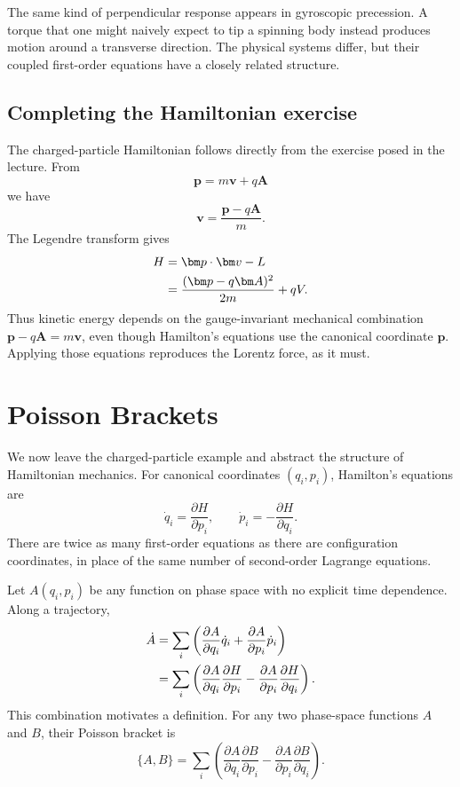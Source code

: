 The same kind of perpendicular response appears in gyroscopic precession. A
torque that one might naively expect to tip a spinning body instead produces
motion around a transverse direction. The physical systems differ, but their
coupled first-order equations have a closely related structure.

\subsection{Completing the Hamiltonian exercise}

The charged-particle Hamiltonian follows directly from the exercise posed in
the lecture. From
\begin{equation}
 \bm p=m\bm v+q\bm A
\end{equation}
we have
\begin{equation}
 \bm v=\frac{\bm p-q\bm A}{m}.
\end{equation}
The Legendre transform gives
\begin{align}
 H&=\bm p\cdot\bm v-L\notag\\
  &=\frac{(\bm p-q\bm A)^2}{2m}+qV.
 \label{eq:l08-charged-hamiltonian}
\end{align}
Thus kinetic energy depends on the gauge-invariant mechanical combination
\(\bm p-q\bm A=m\bm v\), even though Hamilton's equations use the canonical
coordinate \(\bm p\). Applying those equations reproduces the Lorentz force,
as it must.

\section{Poisson Brackets}

We now leave the charged-particle example and abstract the structure of
Hamiltonian mechanics. For canonical coordinates \((q_i,p_i)\), Hamilton's
equations are
\begin{equation}
 \dot q_i=\frac{\partial H}{\partial p_i},
 \qquad
 \dot p_i=-\frac{\partial H}{\partial q_i}.
 \label{eq:l08-hamilton-equations}
\end{equation}
There are twice as many first-order equations as there are configuration
coordinates, in place of the same number of second-order Lagrange equations.

Let \(A(q_i,p_i)\) be any function on phase space with no explicit time
dependence. Along a trajectory,
\begin{align}
 \dot A
 &=\sum_i\left(
 \frac{\partial A}{\partial q_i}\dot q_i
 +\frac{\partial A}{\partial p_i}\dot p_i
 \right)\notag\\
 &=\sum_i\left(
 \frac{\partial A}{\partial q_i}\frac{\partial H}{\partial p_i}
 -\frac{\partial A}{\partial p_i}\frac{\partial H}{\partial q_i}
 \right).
 \label{eq:l08-Adot-chain-rule}
\end{align}
This combination motivates a definition. For any two phase-space functions
\(A\) and \(B\), their Poisson bracket is
\begin{equation}
 \boxed{
 \{A,B\}=\sum_i\left(
 \frac{\partial A}{\partial q_i}\frac{\partial B}{\partial p_i}
 -\frac{\partial A}{\partial p_i}\frac{\partial B}{\partial q_i}
 \right).}
 \label{eq:l08-poisson-definition}
\end{equation}

